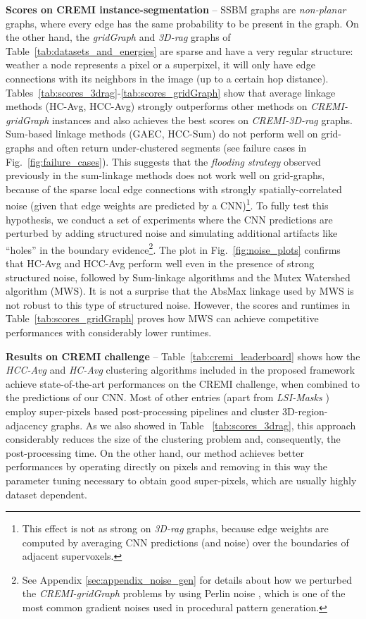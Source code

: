 \textbf{Scores on CREMI instance-segmentation} -- 
SSBM graphs are \emph{non-planar} graphs, where every edge has the same probability to be present in the graph. On the other hand, the \emph{gridGraph} and \emph{3D-rag} graphs of Table~\ref{tab:datasets_and_energies} are sparse and have a very regular structure: weather a node represents a pixel or a superpixel, it will only have edge connections with its neighbors in the image (up to a certain hop distance). 
Tables~\ref{tab:scores_3drag}-\ref{tab:scores_gridGraph} show that average linkage methods (HC-Avg, HCC-Avg) strongly outperforms other methods on \emph{CREMI-gridGraph} instances and also achieves the best scores on \emph{CREMI-3D-rag} graphs. Sum-based linkage methods (GAEC, HCC-Sum) do not perform well on grid-graphs and often return under-clustered segments (see failure cases in Fig.~\ref{fig:failure_cases}). This suggests that the \emph{flooding strategy} observed previously in the sum-linkage methods does not work well on grid-graphs, because of the sparse local edge connections with strongly spatially-correlated noise (given that edge weights are predicted by a CNN)\footnote{This effect is not as strong on \emph{3D-rag} graphs, because edge weights are computed by averaging CNN predictions (and noise) over the boundaries of adjacent supervoxels.}.
To fully test this hypothesis, we conduct a set of experiments where the CNN predictions are perturbed by adding structured noise and simulating additional artifacts like ``holes'' in the boundary evidence\footnote{See Appendix \ref{sec:appendix_noise_gen} for details about how we perturbed the \emph{CREMI-gridGraph} problems by using Perlin noise \cite{perlin2001noise,perlin1985image}, which is one of the most common gradient noises used in procedural pattern generation.}. 
The plot in Fig.~\ref{fig:noise_plots} confirms that HC-Avg and HCC-Avg perform well even in the presence of strong structured noise, followed by Sum-linkage algorithms and the Mutex Watershed algorithm (MWS). It is not a surprise that the AbsMax linkage used by MWS is not robust to this type of structured noise. However, the scores and runtimes in Table~\ref{tab:scores_gridGraph} proves how MWS can achieve competitive performances with considerably lower runtimes. 


\textbf{Results on CREMI challenge} -- 
Table~\ref{tab:cremi_leaderboard} shows how the \emph{HCC-Avg} and \emph{HC-Avg} clustering algorithms included in the proposed \algname{} framework achieve state-of-the-art performances on the CREMI challenge, when combined to the predictions of our CNN.
Most of other entries (apart from \emph{LSI-Masks} \cite{bailoni2020proposal}) employ super-pixels based post-processing pipelines and cluster 3D-region-adjacency graphs. As we also showed in Table ~\ref{tab:scores_3drag}, this approach considerably reduces the size of the clustering problem and, consequently, the post-processing time. 
On the other hand, our method achieves better performances by operating directly on pixels and removing in this way the parameter tuning necessary to obtain good super-pixels, which are usually highly dataset dependent.

